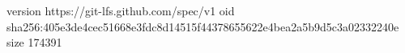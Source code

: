 version https://git-lfs.github.com/spec/v1
oid sha256:405e3de4cec51668e3fdc8d14515f44378655622e4bea2a5b9d5c3a02332240e
size 174391
